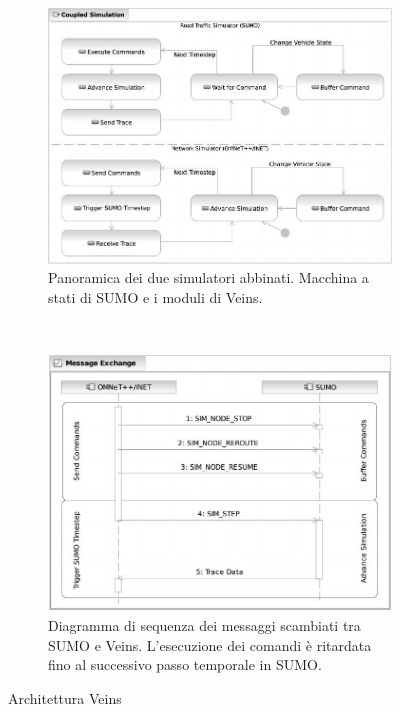 \begin{figure}[H]
        \centering
        \begin{subfigure}[H]{0.5\textwidth}
                \includegraphics[width=\textwidth]{assets/veins-state-machine.jpg}
                \caption{Panoramica dei due simulatori abbinati. Macchina a stati di SUMO e i moduli di Veins.}
                \label{fig:veins-state-machine}
        \end{subfigure}%
        ~ %
        \begin{subfigure}[H]{0.5\textwidth}
                \includegraphics[width=\textwidth]{assets/veins-sequence-diagram.jpg}
                \caption{ Diagramma di sequenza dei messaggi scambiati tra SUMO e Veins. L'esecuzione dei comandi è ritardata fino al successivo passo temporale in SUMO.}
                \label{fig:veins-sequence-diagram}
        \end{subfigure}
        \caption{Architettura Veins}
\end{figure}



